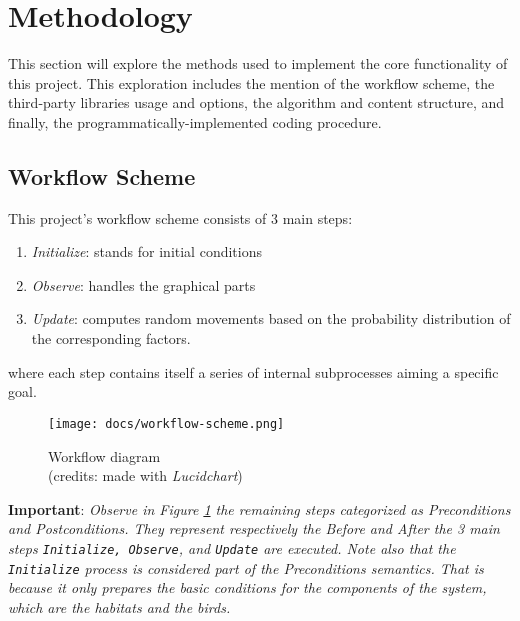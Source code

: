 \section{Methodology}
This section will explore the methods used to implement the core functionality of this project. This exploration includes the mention of the workflow scheme, the third-party libraries usage and options, the algorithm and content structure, and finally, the programmatically-implemented coding procedure.

\subsection{Workflow Scheme}
This project's workflow scheme consists of 3 main steps:
\begin{enumerate}
    \item \textit{Initialize}: stands for initial conditions
    \item \textit{Observe}: handles the graphical parts
    \item \textit{Update}: computes random movements based on the probability distribution of the corresponding factors.
\end{enumerate}
where each step contains itself a series of internal subprocesses aiming a specific goal.

\begin{figure}[h!]
    \centering
    \texttt{[image: docs/workflow-scheme.png]}
    \caption{Workflow diagram \\ (credits: made with \emph{Lucidchart})}
    \label{fig:workflow-scheme}
\end{figure}

\noindent
\textbf{Important}: \textit{Observe in Figure \ref{fig:workflow-scheme} the remaining steps categorized as \emph{Preconditions} and \emph{Postconditions}. They represent respectively the \emph{Before} and \emph{After} the 3 main steps \texttt{Initialize, Observe}, and \texttt{Update} are executed. Note also that the \texttt{Initialize} process is considered part of the Preconditions semantics. That is because it only prepares the basic conditions for the components of the system, which are the habitats and the birds.}

